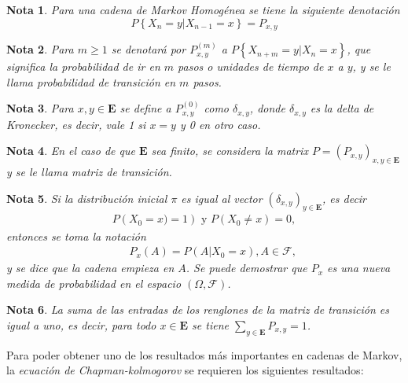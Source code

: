 \documentclass{article}
\newtheorem{Note}{Nota}[section]
\numberwithin{equation}{section}
\begin{document}
\begin{Note}
Para una cadena de Markov Homog\'enea se tiene la siguiente denotaci\'on
\begin{equation}
P\left\{X_{n}=y|X_{n-1}=x\right\}=P_{x,y}
\end{equation}
\end{Note}

\begin{Note}
Para $m\geq1$ se denotar\'a por $P^{(m)}_{x,y}$ a $P\left\{X_{n+m}=y|X_{n}=x\right\}$, que significa la probabilidad de ir en $m$ pasos o unidades de tiempo de $x$ a $y$, y se le llama \textit{probabilidad de transici\'on en $m$ pasos}.
\end{Note}

\begin{Note}
Para $x,y\in\mathbf{E}$ se define a $P^{(0)}_{x,y}$ como $\delta_{x,y}$, donde $\delta_{x,y}$ es la delta de Kronecker, es decir, vale 1 si $x=y$ y 0 en otro caso.
\end{Note}


\begin{Note}
En el caso de que $\mathbf{E}$ sea finito, se considera la matrix $P=\left(P_{x,y}\right)_{x,y\in \mathbf{E}}$ y se le llama \textit{matriz de transici\'on}.
\end{Note}


\begin{Note}
Si la distribuci\'on inicial $\pi$ es igual al vector $\left(\delta_{x,y}\right)_{y\in\mathbf{E}}$, es decir
\begin{eqnarray*}
P\left(X_{0}=x)=1\right)\textrm{ y }P\left(X_{0}\neq x\right)=0,
\end{eqnarray*}
entonces se toma la notaci\'on 
\begin{eqnarray}
&&P_{x}\left(A\right)=P\left(A|X_{0}=x\right),A\in\mathcal{F},
\end{eqnarray}
y se dice que la cadena empieza en $A$. Se puede demostrar que $P_{x}$ es una nueva medida de probabilidad en el espacio $\left(\Omega,\mathcal{F}\right)$.
\end{Note}


\begin{Note}
La suma de las entradas de los renglones de la matriz de transici\'on es igual a uno, es decir, para todo $x\in \mathbf{E}$ se tiene $\sum_{y\in\mathbf{E}}P_{x,y}=1$.
\end{Note}

Para poder obtener uno de los resultados m\'as importantes en cadenas de Markov, la \textit{ecuaci\'on de Chapman-kolmogorov} se requieren los siguientes resultados:
\end{document}
